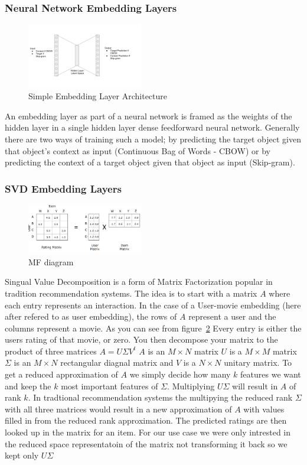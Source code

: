 \subsubsection{Neural Network Embedding Layers}
\begin{figure}[h]
    \centering
    \includegraphics[width=0.45\textwidth]{images/nn_embedding_layer.png}
    \caption{Simple Embedding Layer Architecture}
    \label{fig:Embedding Layer Architecture}
\end{figure}
An embedding layer as part of a neural network is framed as the weights of the hidden layer in a single hidden layer dense feedforward neural network. Generally there are two ways of training such a model; by predicting the target object given that object's context as input (Continuous Bag of Words - CBOW) or by predicting the context of a target object given that object as input (Skip-gram).

\subsubsection{SVD Embedding Layers}
 \begin{figure}[h]
    \centering
    \includegraphics[width=0.45\textwidth]{images/matrix_factorization.png}
    \caption{MF diagram}
    \label{fig:MF diagram}
\end{figure}
Singual Value Decomposition is a form of Matrix Factorization popular in tradition recommendation systems. The idea is to start with a matrix $A$ where each entry represents an interaction. In the case of a User-movie embedding (here after refered to as user embedding), the rows of $A$ represent a user and the columns represent a movie. As you can see from figure~\ref{fig:MF diagram} Every entry is either the users rating of that movie, or zero. You then decompose your matrix to the product of three matrices $A = U\Sigma V^t$ $A$ is an $M \times N$ matrix $U$ is a $M \times M$ matrix $\Sigma$ is an $M \times N$ rectangular diagnal matrix and $V$ is a $N \times N$ unitary matrix. To get a reduced approximation of $A$ we simply decide how many $k$ features we want and keep the $k$ most important features of $\Sigma$. Multiplying $U\Sigma$ will result in $A$ of rank $k$. In tradtional recommendation systems the multipying the reduced rank $\Sigma$ with all three matrices would result in a new approximation of $A$ with values filled in from the reduced rank approximation. The predicted ratings are then looked up in the matrix for an item. For our use case we were only intrested in the reduced space representatoin of the matrix not transforming it back so we kept only $U\Sigma$